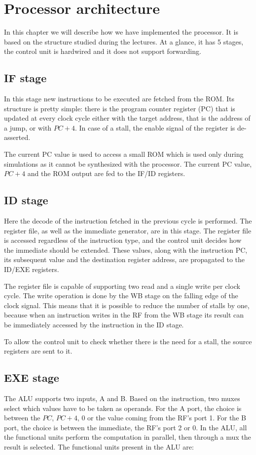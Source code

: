 \chapter{Processor architecture}

In this chapter we will describe how we have implemented the processor. It is based on the structure studied during the
lectures. At a glance, it has 5 stages, the control unit is hardwired and it does not support forwarding.

\section{IF stage}
In this stage new instructions to be executed are fetched from the ROM. Its structure is pretty simple:
there is the program counter register (PC) that is updated at every clock cycle either with the target address,
that is the address of a jump, or with $PC + 4$. In case of a stall, the enable signal of the register is
de-asserted.

The current PC value is used to access a small ROM which is used only during simulations as it cannot be synthesized with
the processor. The current PC value, $PC + 4$ and the ROM output are fed to the IF/ID registers.

\section{ID stage}
Here the decode of the instruction fetched in the previous cycle is performed. The register file, as well as the immediate generator,
are in this stage. The register file is accessed regardless of the instruction type, and the control unit decides how
the immediate should be extended. These values, along with the instruction PC, its subsequent value and the destination register address, are propagated to the
ID/EXE registers.

The register file is capable of supporting two read and a single write per clock cycle. The write operation is done by the
WB stage on the falling edge of the clock signal. This means that it is possible to reduce the number of stalls by one,
because when an instruction writes in the RF from the WB stage its result can be immediately accessed by the instruction in the ID stage.

To allow the control unit to check whether there is the need for a stall, the source registers are sent to it.

\section{EXE stage}
The ALU supports two inputs, A and B. Based on the instruction, two muxes select which values have to be taken as operands.
For the A port, the choice is between the $PC$, $PC+4$, $0$ or the value coming from the RF's port 1. For the B port,
the choice is between the immediate, the RF's port 2 or $0$. In the ALU, all the functional units perform the computation in parallel,
then through a mux the result is selected. The functional units present in the ALU are:

